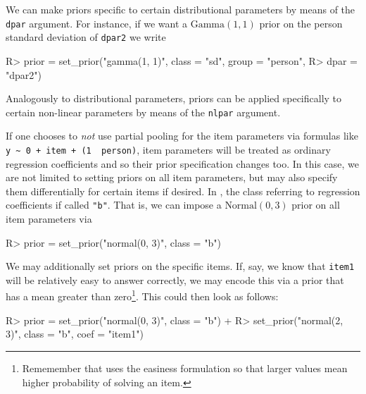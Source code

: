 \documentclass[jss]{jss}
\begin{document}
We can make priors specific to certain distributional parameters by
means of the \texttt{dpar} argument. For instance, if we want a
\(\text{Gamma}(1, 1)\) prior on the person standard deviation of
\texttt{dpar2} we write

\begin{CodeChunk}

\begin{CodeInput}
R> prior = set_prior("gamma(1, 1)", class = "sd", group = "person", 
R>                   dpar = "dpar2")
\end{CodeInput}
\end{CodeChunk}

Analogously to distributional parameters, priors can be applied
specifically to certain non-linear parameters by means of the
\texttt{nlpar} argument.

If one chooses to \emph{not} use partial pooling for the item parameters
via formulas like
\texttt{y\ \textasciitilde{}\ 0\ +\ item\ +\ (1\ \textbar{}\ person)},
item parameters will be treated as ordinary regression coefficients and
so their prior specification changes too. In this case, we are not
limited to setting priors on all item parameters, but may also specify
them differentially for certain items if desired. In , the
class referring to regression coefficients if called \texttt{"b"}. That
is, we can impose a \(\text{Normal}(0, 3)\) prior on all item parameters
via

\begin{CodeChunk}

\begin{CodeInput}
R> prior = set_prior("normal(0, 3)", class = "b")
\end{CodeInput}
\end{CodeChunk}

We may additionally set priors on the specific items. If, say, we know
that \texttt{item1} will be relatively easy to answer correctly, we may
encode this via a prior that has a mean greater than
zero\footnote{Rememember that  uses
the easiness formulation so that larger values mean higher probability of
solving an item.}. This could then look as follows:

\begin{CodeChunk}

\begin{CodeInput}
R> prior = set_prior("normal(0, 3)", class = "b") +
R>   set_prior("normal(2, 3)", class = "b", coef = "item1")
\end{CodeInput}
\end{CodeChunk}
\end{document}
